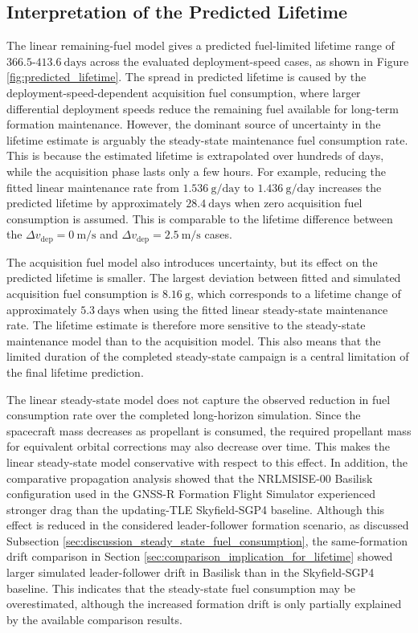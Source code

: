 \subsection{Interpretation of the Predicted Lifetime}

The linear remaining-fuel model gives a predicted fuel-limited lifetime range of $366.5$-$413.6~\mathrm{days}$ across the evaluated deployment-speed cases, as shown in Figure \ref{fig:predicted_lifetime}. The spread in predicted lifetime is caused by the deployment-speed-dependent acquisition fuel consumption, where larger differential deployment speeds reduce the remaining fuel available for long-term formation maintenance. However, the dominant source of uncertainty in the lifetime estimate is arguably the steady-state maintenance fuel consumption rate. This is because the estimated lifetime is extrapolated over hundreds of days, while the acquisition phase lasts only a few hours. For example, reducing the fitted linear maintenance rate from $1.536~\mathrm{g/day}$ to $1.436~\mathrm{g/day}$ increases the predicted lifetime by approximately $28.4~\mathrm{days}$ when zero acquisition fuel consumption is assumed. This is comparable to the lifetime difference between the $\Delta v_{\mathrm{dep}}=0~\mathrm{m/s}$ and $\Delta v_{\mathrm{dep}}=2.5~\mathrm{m/s}$ cases.

The acquisition fuel model also introduces uncertainty, but its effect on the predicted lifetime is smaller. The largest deviation between fitted and simulated acquisition fuel consumption is $8.16~\mathrm{g}$, which corresponds to a lifetime change of approximately $5.3~\mathrm{days}$ when using the fitted linear steady-state maintenance rate. The lifetime estimate is therefore more sensitive to the steady-state maintenance model than to the acquisition model. This also means that the limited duration of the completed steady-state campaign is a central limitation of the final lifetime prediction.

The linear steady-state model does not capture the observed reduction in fuel consumption rate over the completed long-horizon simulation. Since the spacecraft mass decreases as propellant is consumed, the required propellant mass for equivalent orbital corrections may also decrease over time. This makes the linear steady-state model conservative with respect to this effect. In addition, the comparative propagation analysis showed that the NRLMSISE-00 Basilisk configuration used in the GNSS-R Formation Flight Simulator experienced stronger drag than the updating-TLE Skyfield-SGP4 baseline. Although this effect is reduced in the considered leader-follower formation scenario, as discussed Subsection \ref{sec:discussion_steady_state_fuel_consumption}, the same-formation drift comparison in Section \ref{sec:comparison_implication_for_lifetime} showed larger simulated leader-follower drift in Basilisk than in the Skyfield-SGP4 baseline. This indicates that the steady-state fuel consumption may be overestimated, although the increased formation drift is only partially explained by the available comparison results.


